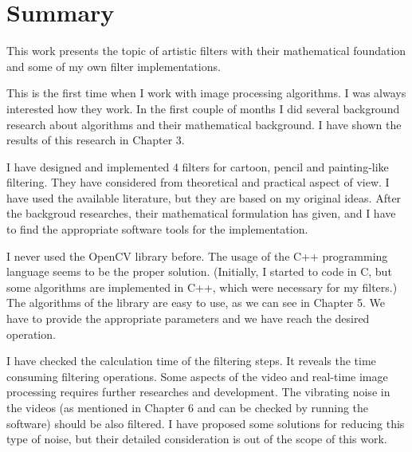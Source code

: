 \documentclass[a4paper,12pt]{article}
\begin{document}
\pagestyle{empty}

\section*{Summary}

This work presents the topic of artistic filters with their mathematical foundation and some of my own filter implementations.

This is the first time when I work with image processing algorithms. I was always interested how they work. In the first couple of months I did several background research about algorithms and their mathematical background. I have shown the results of this research in Chapter 3.

I have designed and implemented 4 filters for cartoon, pencil and painting-like filtering. They have considered from theoretical and practical aspect of view. I have used the available literature, but they are based on my original ideas. After the backgroud researches, their mathematical formulation has given, and I have to find the appropriate software tools for the implementation.

I never used the OpenCV library before. The usage of the C++ programming language seems to be the proper solution. (Initially, I started to code in C, but some algorithms are implemented in C++, which were necessary for my filters.) The algorithms of the library are easy to use, as we can see in Chapter 5. We have to provide the appropriate parameters and we have reach the desired operation.

I have checked the calculation time of the filtering steps. It reveals the time consuming filtering operations. Some aspects of the video and real-time image processing requires further researches and development. The vibrating noise in the videos (as mentioned in Chapter 6 and can be checked by running the software) should be also filtered. I have proposed some solutions for reducing this type of noise, but their detailed consideration is out of the scope of this work.
\end{document}
